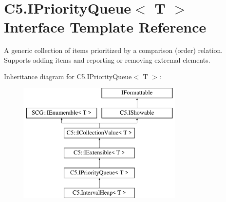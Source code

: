 \hypertarget{interface_c5_1_1_i_priority_queue}{}\section{C5.\+I\+Priority\+Queue$<$ T $>$ Interface Template Reference}
\label{interface_c5_1_1_i_priority_queue}


A generic collection of items prioritized by a comparison (order) relation. Supports adding items and reporting or removing extremal elements.  


Inheritance diagram for C5.\+I\+Priority\+Queue$<$ T $>$\+:\begin{figure}[H]
\begin{center}
\leavevmode
\includegraphics[height=6.000000cm]{interface_c5_1_1_i_priority_queue}
\end{center}
\end{figure}
